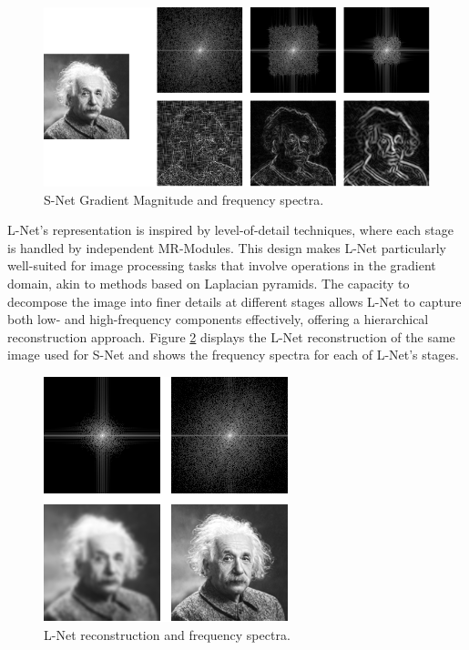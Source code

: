 \begin{figure}[!h]
\centering
\includegraphics[width=0.8\linewidth]{img/ch5/albert.png}
\caption{S-Net Gradient Magnitude and frequency spectra.}
\label{f:albert-snet}
\end{figure}


L-Net’s representation is inspired by level-of-detail techniques, where each stage is handled by independent MR-Modules. This design makes L-Net particularly well-suited for image processing tasks that involve operations in the gradient domain, akin to methods based on Laplacian pyramids. The capacity to decompose the image into finer details at different stages allows L-Net to capture both low- and high-frequency components effectively, offering a hierarchical reconstruction approach. Figure \ref{f:albert-lnet} displays the L-Net reconstruction of the same image used for S-Net and shows the frequency spectra for each of L-Net's stages.

\begin{figure}[!h]
\centering
\includegraphics[width=0.80\linewidth]{img/ch5/albert-lnet.png}
\caption{L-Net reconstruction and frequency spectra.}
\label{f:albert-lnet}
\end{figure}



